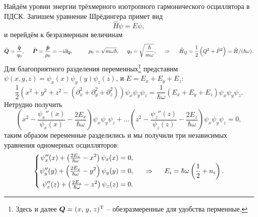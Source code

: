 Найдём уровни энергии трёхмерного изотропного гармонического осциллятора в ПДСК. Запишем уравнение Шрёдингера примет вид
\begin{equation*}
    \hat{H} \psi = E \psi, 
\end{equation*}
и перейдём к безразмерным величинам
\begin{equation*}
    \hat{\vc{Q}} = \frac{\hat{\vc{q}}}{q_0}, \hspace{5 mm} 
    \hat{\vc{P}} = \frac{\hat{\vc{p}}}{p_0} = - i \partial_{\smallvc{Q}},
    \hspace{10 mm} 
    p_0 = \sqrt{m \omega \hbar}, \hspace{5 mm} 
    q_0 = \sqrt{\frac{\hbar}{m \omega}},
    \hspace{0.5cm} \Rightarrow \hspace{0.5cm}
    \hat{H}_Q = \frac{1}{2}\left(Q^2 + \hat{P}^2\right) = \hat{H}/(\hbar \omega).
\end{equation*}
Для благоприятного разделения переменных\footnote{
    Здесь и далее $\mbox{\boldmath $Q$} = (x,\, y,\, z)^{\text{T}}$ -- обезразмеренные для удобства перменные.
}  представим $\psi(x, y, z) = \psi_x(x) \psi_y (y) \psi_z (z)$, и $E = E_x + E_y + E_z$:
\begin{equation*}
    \frac{1}{2} \left({x^2 + y^2 + z^2} - \left(\partial_x^2 + \partial_y^2 + \partial_z^2\right)\right) \psi_x \psi_y \psi_z = \frac{1}{\hbar \omega}(E_x + E_y + E_z) \psi_x \psi_y \psi_z.
\end{equation*}
Нетрудно получить
\begin{equation*}
    \left(x^2 - \frac{\psi_x''(x)}{\psi_x(x)} - \frac{2 E_x}{\hbar \omega}\right) \psi_x \psi_y \psi_z + \ldots \left(z^2 - \frac{\psi_z''(z)}{\psi_z(z)} - \frac{2 E_z}{\hbar \omega}\right) \psi_x \psi_y \psi_z = 0,
\end{equation*}
таким образом переменные разделились и мы получили три независимых уравнения одномерных осцилляторов:
\begin{equation*}
    \left\{\begin{aligned}
        \psi_x''(x) + \left(\tfrac{2 E_x}{\hbar \omega} - x^2\right) \psi_x(x) &= 0, \\
        \psi_y''(y) + \left(\tfrac{2 E_y}{\hbar \omega} - y^2\right) \psi_y(y) &= 0, \\
        \psi_z''(z) + \left(\tfrac{2 E_z}{\hbar \omega} - z^2\right) \psi_z(z) &= 0. \\
    \end{aligned}\right.
    \hspace{0.5cm} \Rightarrow \hspace{0.5cm}
    E_i = \hbar \omega \left(\frac{1}{2} + n_i\right).
\end{equation*}
